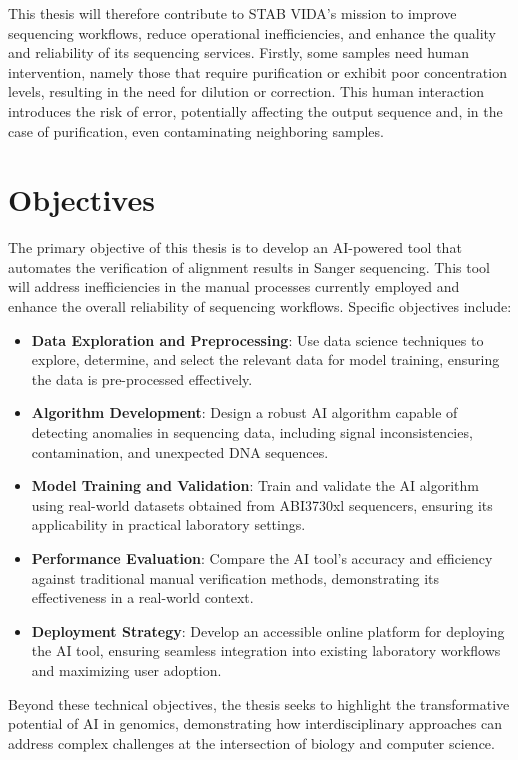 This thesis will therefore contribute to STAB VIDA’s mission to improve sequencing workflows, reduce operational inefficiencies, and enhance the quality and reliability of its sequencing services.
Firstly, some samples need human intervention, namely those that require purification or exhibit poor concentration levels, resulting in the need for dilution or correction. This human interaction introduces the risk of error, potentially affecting the output sequence and, in the case of purification, even contaminating neighboring samples.

\section{Objectives}
\label{sec:Objectives}

The primary objective of this thesis is to develop an AI-powered tool that automates the verification of alignment results in Sanger sequencing. This tool will address inefficiencies in the manual processes currently employed and enhance the overall reliability of sequencing workflows. Specific objectives include:

\begin{itemize}
  \item \textbf{Data Exploration and Preprocessing}: Use data science techniques to explore, determine, and select the relevant data for model training, ensuring the data is pre-processed effectively.
  \item \textbf{Algorithm Development}: Design a robust AI algorithm capable of detecting anomalies in sequencing data, including signal inconsistencies, contamination, and unexpected DNA sequences.
  \item \textbf{Model Training and Validation}: Train and validate the AI algorithm using real-world datasets obtained from ABI3730xl sequencers, ensuring its applicability in practical laboratory settings.
  \item \textbf{Performance Evaluation}: Compare the AI tool's accuracy and efficiency against traditional manual verification methods, demonstrating its effectiveness in a real-world context.
  \item \textbf{Deployment Strategy}: Develop an accessible online platform for deploying the AI tool, ensuring seamless integration into existing laboratory workflows and maximizing user adoption.
\end{itemize}

Beyond these technical objectives, the thesis seeks to highlight the transformative potential of AI in genomics, demonstrating how interdisciplinary approaches can address complex challenges at the intersection of biology and computer science.

